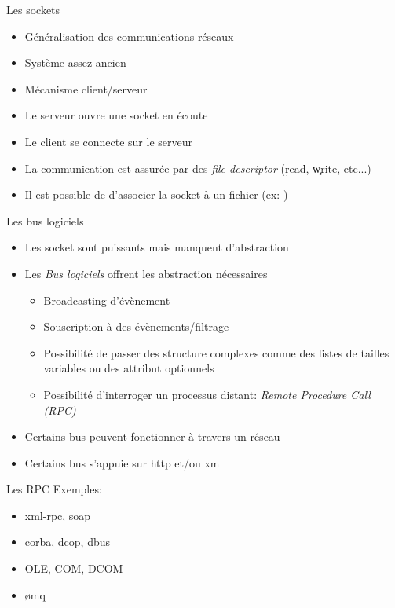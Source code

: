 \begin{frame}[fragile=singleslide]{Les sockets}
  \begin{itemize}
  \item Généralisation des communications réseaux
  \item Système assez ancien
  \item Mécanisme client/serveur
  \item Le serveur ouvre une socket en écoute
  \item Le client se connecte sur le serveur
  \item  La communication  est  assurée par  des \emph{file  descriptor}
    (\c{read}, \c{write}, etc...)
  \item  Il est  possible  de d'associer  la  socket à  un fichier  (ex:
    )
  \end{itemize}
\end{frame}

\begin{frame}[fragile=singleslide]{Les bus logiciels}
  \begin{itemize}
    \item Les socket sont puissants mais manquent d'abstraction
    \item Les \emph{Bus logiciels} offrent les abstraction nécessaires
      \begin{itemize}
        \item Broadcasting d'évènement
        \item Souscription à des évènements/filtrage
        \item Possibilité de passer  des structure complexes comme des
          listes de tailles variables ou des attribut optionnels
        \item   Possibilité   d'interroger   un   processus   distant:
          \emph{Remote Procedure Call (RPC)}
        \end{itemize}
      \item Certains bus peuvent fonctionner à travers un réseau
        \item Certains bus s'appuie sur http et/ou xml
  \end{itemize}
\end{frame}

\begin{frame}[fragile=singleslide]{Les RPC}
  Exemples:
  \begin{itemize}
  \item xml-rpc, soap
  \item corba, dcop, dbus
  \item OLE, COM, DCOM
  \item ømq
  \end{itemize}
\end{frame}
